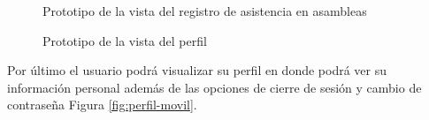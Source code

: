 \begin{figure}[H]
    \centering
    \caption{Prototipo de la vista del registro de asistencia en asambleas}
    \label{fig:asambleas-asistencia-movil}
\end{figure}

\begin{figure}[H]
    \centering
    \caption{Prototipo de la vista del perfil}
    \label{fig:asambleas-votacion-movil}
\end{figure}

Por último el usuario podrá visualizar su perfil en donde podrá ver su información personal además de las opciones de cierre de sesión y cambio de contraseña Figura \ref{fig:perfil-movil}.

